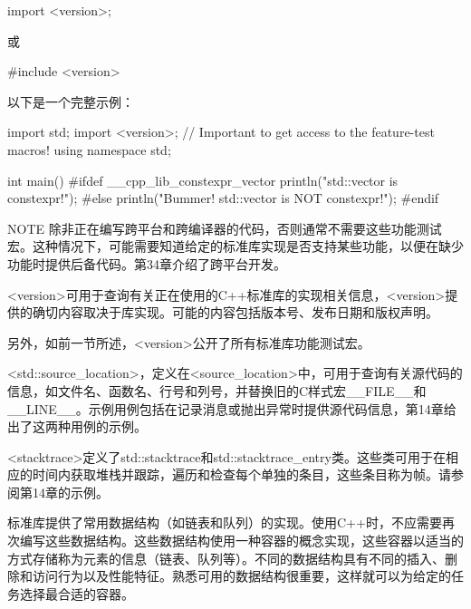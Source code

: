 \begin{cpp}
import <version>;
\end{cpp}

或

\begin{cpp}
#include <version>
\end{cpp}

以下是一个完整示例：

\begin{cpp}
import std;
import <version>; // Important to get access to the feature-test macros!
using namespace std;

int main()
{
#ifdef __cpp_lib_constexpr_vector
    println("std::vector is constexpr!");
#else
    println("Bummer! std::vector is NOT constexpr!");
#endif
}
\end{cpp}

\begin{myNotic}{NOTE}
除非正在编写跨平台和跨编译器的代码，否则通常不需要这些功能测试宏。这种情况下，可能需要知道给定的标准库实现是否支持某些功能，以便在缺少功能时提供后备代码。第34章介绍了跨平台开发。
\end{myNotic}


<version>可用于查询有关正在使用的C++标准库的实现相关信息，<version>提供的确切内容取决于库实现。可能的内容包括版本号、发布日期和版权声明。

另外，如前一节所述，<version>公开了所有标准库功能测试宏。


<std::source\_location>，定义在<source\_location>中，可用于查询有关源代码的信息，如文件名、函数名、行号和列号，并替换旧的C样式宏\_\_FILE\_\_和\_\_LINE\_\_。示例用例包括在记录消息或抛出异常时提供源代码信息，第14章给出了这两种用例的示例。



<stacktrace>定义了std::stacktrace和std::stacktrace\_entry类。这些类可用于在相应的时间内获取堆栈并跟踪，遍历和检查每个单独的条目，这些条目称为帧。请参阅第14章的示例。


标准库提供了常用数据结构（如链表和队列）的实现。使用C++时，不应需要再次编写这些数据结构。这些数据结构使用一种容器的概念实现，这些容器以适当的方式存储称为元素的信息（链表、队列等）。不同的数据结构具有不同的插入、删除和访问行为以及性能特征。熟悉可用的数据结构很重要，这样就可以为给定的任务选择最合适的容器。

